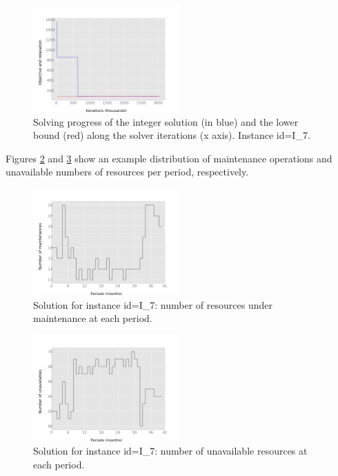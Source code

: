 \documentclass[a4paper,twocolumn,fleqn]{article}
\begin{document}
    \begin{figure}
      \centering
        \includegraphics[width=0.5\textwidth]{./../../img/progress.png}
      \caption{Solving progress of the integer solution (in blue) and the lower bound (red) along the solver iterations (x axis). Instance id=I\_7.}
      \label{fig:progress}
    \end{figure}

    Figures \ref{fig:num-maintenances} and \ref{fig:num-unavailables} show an example distribution of maintenance operations and unavailable numbers of resources per period, respectively.

    \begin{figure}
      \centering
        \includegraphics[width=0.5\textwidth]{./../../img/num-maintenances.png}
      \caption{Solution for instance id=I\_7: number of resources under maintenance at each period.}
      \label{fig:num-maintenances}
    \end{figure}

    \begin{figure}
      \centering
        \includegraphics[width=0.5\textwidth]{./../../img/num-unavailables.png}
      \caption{Solution for instance id=I\_7: number of unavailable resources at each period.}
      \label{fig:num-unavailables}
    \end{figure}
\end{document}
